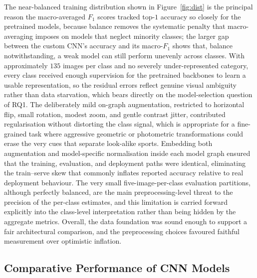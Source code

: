 The near-balanced training distribution shown in Figure~\ref{fig:dist} is the principal reason the macro-averaged $F_1$ scores tracked top-$1$ accuracy so closely for the pretrained models, because balance removes the systematic penalty that macro-averaging imposes on models that neglect minority classes; the larger gap between the custom CNN's accuracy and its macro-$F_1$ shows that, balance notwithstanding, a weak model can still perform unevenly across classes.
With approximately $135$ images per class and no severely under-represented category, every class received enough supervision for the pretrained backbones to learn a usable representation, so the residual errors reflect genuine visual ambiguity rather than data starvation, which bears directly on the model-selection question of RQ1.
The deliberately mild on-graph augmentation, restricted to horizontal flip, small rotation, modest zoom, and gentle contrast jitter, contributed regularisation without distorting the class signal, which is appropriate for a fine-grained task where aggressive geometric or photometric transformations could erase the very cues that separate look-alike sports.
Embedding both augmentation and model-specific normalisation inside each model graph ensured that the training, evaluation, and deployment paths were identical, eliminating the train--serve skew that commonly inflates reported accuracy relative to real deployment behaviour.
The very small five-image-per-class evaluation partitions, although perfectly balanced, are the main preprocessing-level threat to the precision of the per-class estimates, and this limitation is carried forward explicitly into the class-level interpretation rather than being hidden by the aggregate metrics.
Overall, the data foundation was sound enough to support a fair architectural comparison, and the preprocessing choices favoured faithful measurement over optimistic inflation.

\subsection{Comparative Performance of CNN Models}
\label{subsec:disc-models}

